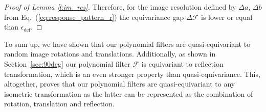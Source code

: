 \documentclass[10pt,journal,compsoc]{IEEEtran}
\begin{document}
\begin{proof}[Proof of Lemma \ref{l:im_res}]
		Therefore, for the image resolution defined by $\Delta a$, $\Delta b$ from Eq.~(\ref{eq:response_pattern_r}) the equivariance gap $\Delta \mathcal{F}$ is lower or equal than $\epsilon_\text{def}$.
	\end{proof}


	To sum up, we have shown that our polynomial filters are quasi-equivariant to random image rotations and translations. Additionally, as shown in Section~\ref{sec:90deg} our polynomial filter $\mathcal{F}$ is equivariant to reflection transformation, which is an even stronger property than quasi-equivariance. This, altogether, proves that our polynomial filters are quasi-equivariant to any isometric transformation as the latter can be represented as the combination of rotation, translation and reflection.

\end{document}
